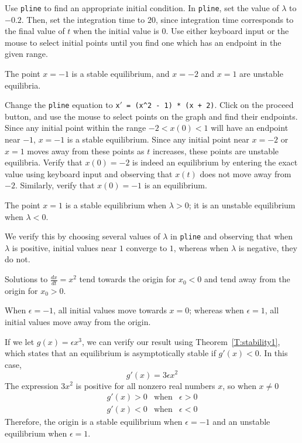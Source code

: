 \documentclass{ximera}
\begin{document}
\soln Use {\tt pline} to find an appropriate initial condition.
In {\tt pline}, set the value of $\lambda$ to $-0.2$.  Then, set the
integration time to $20$, since integration time corresponds to the
final value of $t$ when the initial value is $0$.  Use either
keyboard input or the mouse to select initial points until you
find one which has an endpoint in the given range. 

\ans The point $x = -1$ is a stable equilibrium, and $x = -2$ and $x = 1$
are unstable equilibria.

\soln Change the {\tt pline} equation to
{\tt x$'$ = (x\^{}2 - 1) * (x + 2)}.  Click on the proceed button, and
use the mouse to select points on the graph and find their endpoints. 
Since any initial point within the range $-2 < x(0) < 1$ will have an
endpoint near $-1$, $x = -1$ is a stable equilibrium.  Since any initial
point near $x = -2$ or $x = 1$ moves away from these points as $t$
increases, these points are unstable equilibria.  Verify that $x(0)
= -2$ is indeed an equilibrium by entering the exact value using
keyboard input and observing that $x(t)$ does not move away from
$-2$.  Similarly, verify that $x(0) = -1$ is an equilibrium.

\ans The point $x = 1$ is a stable equilibrium when $\lambda > 0$; it is
an unstable equilibrium when $\lambda < 0$. 

\soln We verify this by choosing several values of $\lambda$ in
{\tt pline} and observing that when $\lambda$ is positive, initial values
near $1$ converge to $1$, whereas when $\lambda$ is negative, they do not.

Solutions to $\frac{dx}{dt} = x^2$ tend towards the origin for $x_0 < 0$
and tend away from the origin for $x_0 > 0$.

\ans When $\epsilon = -1$, all initial values move towards $x = 0$; whereas
when $\epsilon = 1$, all initial values move away from the origin. 

\soln If we let $g(x) = \epsilon x^3$, we can verify our result using
Theorem~\ref{T:stability1}, which states
that an equilibrium is asymptotically stable if $g'(x) < 0$.  In this case,
\[
g'(x) = 3\epsilon x^2
\]
The expression $3x^2$ is positive for all nonzero real numbers $x$, so
when $x \neq 0$
\[ \begin{array}{ccc}
g'(x) > 0 & \mbox{when} & \epsilon > 0 \\
g'(x) < 0 & \mbox{when} & \epsilon < 0 \end{array}
\]
Therefore, the origin is a stable equilibrium when $\epsilon = -1$ and
an unstable equilibrium when $\epsilon = 1$.
\end{document}
